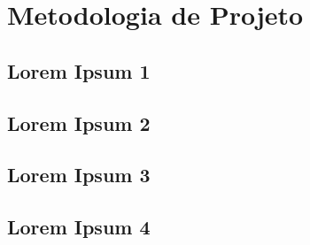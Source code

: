 \chapter{Metodologia de Projeto}

\section{Lorem Ipsum 1}

\lipsum[1-4]

\section{Lorem Ipsum 2}

\lipsum[1-4]

\section{Lorem Ipsum 3}

\lipsum[1-4]

\section{Lorem Ipsum 4}

\lipsum[1-4]


